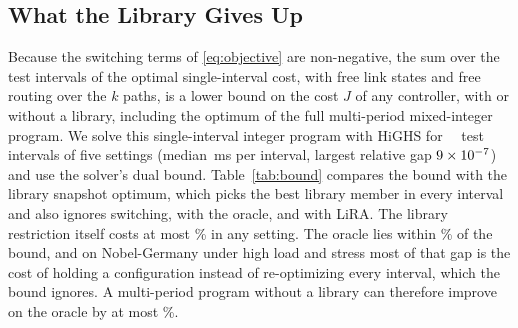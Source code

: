 \documentclass[journal]{IEEEtran}
\begin{document}
\begin{table}[t]
\centering
\caption{Per-Snapshot Optimization Baselines on a Test Subsample}
\label{tab:opt}
\footnotesize
\setlength{\tabcolsep}{4pt}

\end{table}

\begin{table}[t]
\centering
\caption{Scalability of the Optimization Step and the Safety Check}
\label{tab:scale}
\footnotesize
\setlength{\tabcolsep}{2pt}

\end{table}

\subsection{What the Library Gives Up}\label{sec:res-bound}

Because the switching terms of \eqref{eq:objective} are non-negative, the sum over the test intervals of the optimal single-interval cost, with free link states and free routing over the $k$ paths, is a lower bound on the cost $J$ of any controller, with or without a library, including the optimum of the full multi-period mixed-integer program. We solve this single-interval integer program with HiGHS for \boundAllOptimal\ \boundIntervals\ test intervals of five settings (median \boundMedianMs\,ms per interval, largest relative gap $9\times10^{-7}$) and use the solver's dual bound. Table~\ref{tab:bound} compares the bound with the library snapshot optimum, which picks the best library member in every interval and also ignores switching, with the oracle, and with LiRA. The library restriction itself costs at most \boundMaxLoss\% in any setting. The oracle lies within \boundMaxGap\% of the bound, and on Nobel-Germany under high load and stress most of that gap is the cost of holding a configuration instead of re-optimizing every interval, which the bound ignores. A multi-period program without a library can therefore improve on the oracle by at most \boundMaxGap\%.

\begin{table}[t]
\centering
\caption{Lower Bound on the Cost of Any Controller (Sum of Per-Interval Optima), the Library Snapshot Optimum, the Oracle, and LiRA on the Test Split. Library Loss Is the Snapshot Optimum Above the Bound, O$^\star$ Gap the Oracle Above the Bound, Both Relative to the Oracle Cost}
\label{tab:bound}
\scriptsize
\setlength{\tabcolsep}{2pt}

\end{table}
\end{document}
